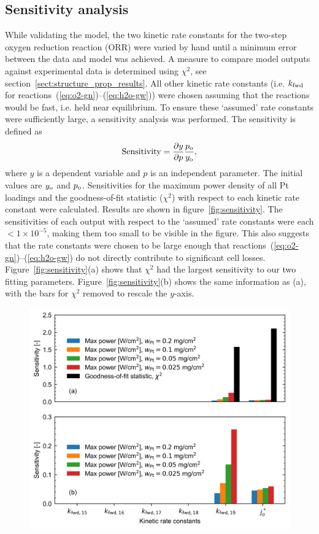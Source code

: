\documentclass[final,3p,times,onecolumn]{elsarticle}    %
\newcommand{\crr}[1]{\color{red} #1 \color{black}} %
\begin{document}
\newpage
\crr{\subsection{Sensitivity analysis}
While validating the model, the two kinetic rate constants for the two-step oxygen reduction reaction (ORR) were varied by hand until a minimum error between the data and model was achieved. A measure to compare model outputs against experimental data is determined using $\chi^2$, see section~\ref{sect:structure_prop_results}. All other kinetic rate constants (i.e. $k_{\rm fwd}$ for reactions~(\ref{eq:o2-gn})--(\ref{eq:h2o-gw})) were chosen assuming that the reactions would be fast, i.e. held near equilibrium. To ensure these `assumed' rate constants were sufficiently large, a sensitivity analysis was performed. The sensitivity is defined as
\begin{equation}
    {\rm Sensitivity} = \frac{\partial y}{\partial p} \frac{p_{\rm o}}{y_{\rm o}},
\end{equation}
where $y$ is a dependent variable and $p$ is an independent parameter. The initial values are $y_{\rm o}$ and $p_{\rm o}$. Sensitivities for the maximum power density of all Pt loadings and the goodness-of-fit statistic ($\chi^2$) with respect to each kinetic rate constant were calculated. Results are shown in figure~\ref{fig:sensitivity}. The sensitivities of each output with respect to the `assumed' rate constants were each $< 1\times10^{-5}$, making them too small to be visible in the figure. This also suggests that the rate constants were chosen to be large enough that reactions~(\ref{eq:o2-gn})--(\ref{eq:h2o-gw}) do not directly contribute to significant cell losses. Figure~\ref{fig:sensitivity}(a) shows that $\chi^2$ had the largest sensitivity to our two fitting parameters. Figure~\ref{fig:sensitivity}(b) shows the same information as (a), with the bars for $\chi^2$ removed to rescale the $y$-axis.
\begin{figure}[!htb]
    \centering
    \includegraphics[width=5.648in]{figures/sensitivity-5_648in.png}

\end{figure}}
\end{document}
